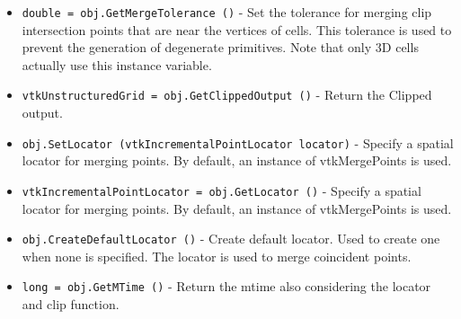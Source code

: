 \begin{itemize}
\item  \verb|double = obj.GetMergeTolerance ()| -  Set the tolerance for merging clip intersection points that are near
 the vertices of cells. This tolerance is used to prevent the generation
 of degenerate primitives. Note that only 3D cells actually use this
 instance variable.

\item  \verb|vtkUnstructuredGrid = obj.GetClippedOutput ()| -  Return the Clipped output.

\item  \verb|obj.SetLocator (vtkIncrementalPointLocator locator)| -  Specify a spatial locator for merging points. By default, an
 instance of vtkMergePoints is used.

\item  \verb|vtkIncrementalPointLocator = obj.GetLocator ()| -  Specify a spatial locator for merging points. By default, an
 instance of vtkMergePoints is used.

\item  \verb|obj.CreateDefaultLocator ()| -  Create default locator. Used to create one when none is specified. The 
 locator is used to merge coincident points.

\item  \verb|long = obj.GetMTime ()| -  Return the mtime also considering the locator and clip function.

\end{itemize}
